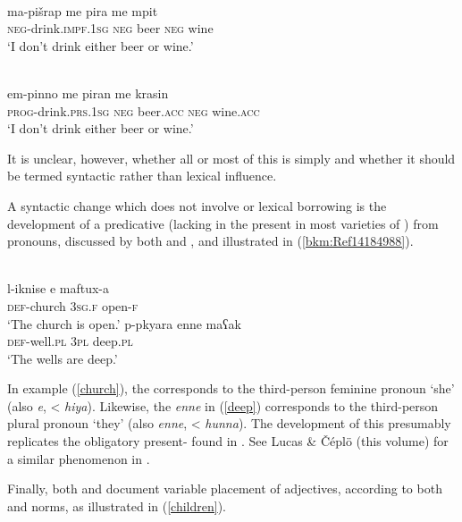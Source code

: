 \documentclass[output=paper]{langsci/langscibook}
\begin{document}
\ea\label{beer}
\ea {}\\
\gll ma-pišrap me pira me mpit\\
    \textsc{neg}-drink.\textsc{impf.1sg} \textsc{neg} beer \textsc{neg} wine  \\
\glt ‘I don’t drink either beer or wine.’

\ex
{} \\
\gll em-pinno me piran me krasin\\
    \textsc{prog}-drink.\textsc{prs.1sg} \textsc{neg}  beer.\textsc{acc} \textsc{neg} wine.\textsc{acc} \\
\glt ‘I don’t drink either beer or wine.’
\z
\z

It is unclear, however, whether all or most of this is simply  and whether it should be termed syntactic rather than lexical influence.

A syntactic change which does not involve  or lexical borrowing is the development of a predicative  (lacking in the present  in most varieties of ) from  pronouns, discussed by both \citet{Roth2004} and \citet{Borg1985}, and illustrated in (\ref{bkm:Ref14184988}).



\newpage
\ea {}\label{bkm:Ref14184988}\\
\ea \gll l-iknise e maftux-a\\
     \textsc{def}-church \textsc{3sg.f} open-\textsc{f}  \\
\glt ‘The church is open.’ \label{church}
\ex \gll p-pkyara enne maʕak\\
     \textsc{def}-well.\textsc{pl}  \textsc{3pl} deep.\textsc{pl}\\
\glt ‘The wells are deep.’ \label{deep}
\z
\z

In example (\ref{church}), the  corresponds to the third-person feminine pronoun ‘she’ (also \textit{e}, < \textit{hiya}). Likewise, the  \textit{enne} in (\ref{deep}) corresponds to the third-person plural pronoun ‘they’ (also \textit{enne}, < \textit{hunna}). The development of this  presumably replicates the obligatory present-  found in . See Lucas \& Čéplö (this volume) for a similar phenomenon in .

Finally, both \citet{Roth2004} and \citet{Newton1964} document variable placement of adjectives, according to both  and  norms, as illustrated in (\ref{children}).
\end{document}
